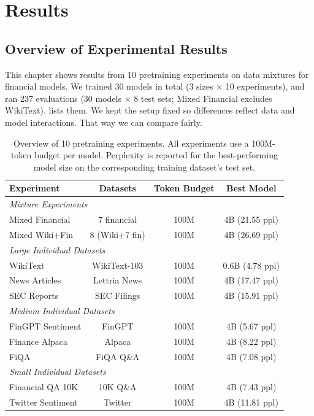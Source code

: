 \chapter{Results}

\section{Overview of Experimental Results}

This chapter shows results from 10 pretraining experiments on data mixtures for financial models. We trained 30 models in total (3 sizes $\times$ 10 experiments), and ran 237 evaluations (30 models $\times$ 8 test sets; Mixed Financial excludes WikiText).  lists them. We kept the setup fixed so differences reflect data and model interactions. That way we can compare fairly.

\begin{table}[h]
\centering
\small
\begin{tabular}{lccc}
\toprule
\textbf{Experiment} & \textbf{Datasets} & \textbf{Token Budget} & \textbf{Best Model} \\
\midrule
\multicolumn{4}{l}{\textit{Mixture Experiments}} \\
Mixed Financial & 7 financial & 100M & 4B (21.55 ppl) \\
Mixed Wiki+Fin & 8 (Wiki+7 fin) & 100M & 4B (26.69 ppl) \\
\midrule
\multicolumn{4}{l}{\textit{Large Individual Datasets}} \\
WikiText & WikiText-103 & 100M & 0.6B (4.78 ppl) \\
News Articles & Lettria News & 100M & 4B (17.47 ppl) \\
SEC Reports & SEC Filings & 100M & 4B (15.91 ppl) \\
\midrule
\multicolumn{4}{l}{\textit{Medium Individual Datasets}} \\
FinGPT Sentiment & FinGPT & 100M & 4B (5.67 ppl) \\
Finance Alpaca & Alpaca & 100M & 4B (8.22 ppl) \\
FiQA & FiQA Q\&A & 100M & 4B (7.08 ppl) \\
\midrule
\multicolumn{4}{l}{\textit{Small Individual Datasets}} \\
Financial QA 10K & 10K Q\&A & 100M & 4B (7.43 ppl) \\
Twitter Sentiment & Twitter & 100M & 4B (11.81 ppl) \\
\bottomrule
\end{tabular}
\caption[Overview of Pretraining Experiments]{Overview of 10 pretraining experiments. All experiments use a 100M-token budget per model. Perplexity is reported for the best-performing model size on the corresponding training dataset's test set.}
\label{tab:experiments_overview}
\end{table}

